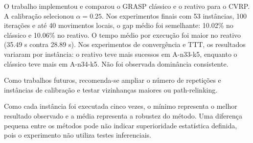\documentclass[12pt]{article}
\begin{document}
O trabalho implementou e comparou o GRASP clássico e o reativo para o CVRP. A calibração selecionou $\alpha=0.25$. Nos experimentos finais com 53 instâncias, 100 iterações e até 40 movimentos locais, o gap médio foi semelhante: 10.02\% no clássico e 10.06\% no reativo. O tempo médio por execução foi maior no reativo (35.49 s contra 28.89 s). Nos experimentos de convergência e TTT, os resultados variaram por instância: o reativo teve mais sucessos em A-n33-k5, enquanto o clássico teve mais em A-n34-k5. Não foi observada dominância consistente.

Como trabalhos futuros, recomenda-se ampliar o número de repetições e instâncias de calibração e testar vizinhanças maiores ou path-relinking.

Como cada instância foi executada cinco vezes, o mínimo representa o melhor resultado observado e a média representa a robustez do método. Uma diferença pequena entre os métodos pode não indicar superioridade estatística definida, pois o experimento não utiliza testes inferenciais.

\renewcommand{\refname}{Referências}

\end{document}
